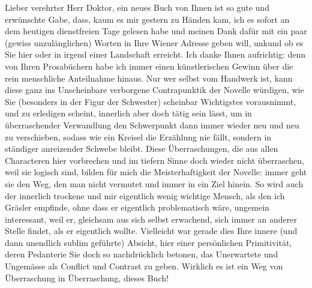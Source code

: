 \pstart{}Lieber verehrter Herr Doktor,\pend\vspace{0.5em}
\pstart
           ein neues Buch von Ihnen ist
               so gute und erwünschte Gabe, dass, kaum es mir gestern zu Händen kam, ich es sofort
               an dem heutigen dienstfreien Tage gelesen habe und meinen Dank dafür mit ein paar
               (gewiss unzulänglichen) Worten in Ihre Wiener Adresse geben will, unkund ob es Sie hier oder in
               irgend einer Landschaft erreicht. Ich danke Ihnen aufrichtig: denn von Ihren
               Prosabüchern habe ich immer einen künstlerischen Gewinn über die rein menschliche
               Anteilnahme hinaus. Nur wer selbst vom Handwerk ist, kann diese ganz ins Unscheinbare
               verborgene Contrapunktik der Novelle würdigen, wie Sie (besonders in der Figur der Schwester) scheinbar Wichtigstes
               vorausnimmt, {\pb}und zu erledigen scheint,
               innerlich aber doch tätig sein lässt, um in überraschender Verwandlung den
               Schwerpunkt dann immer wieder neu und neu zu verschieben, sodass wie ein Kreisel die
                  Erzählung nie fällt,
               sondern in ständiger anreizender Schwebe bleibt. Diese Überraschungen, die aus allen
               Characteren hier vorbrechen und im tiefern Sinne doch wieder nicht überraschen, weil
               sie logisch sind, bilden für mich die Meisterhaftigkeit der Novelle: immer geht sie den Weg, den man
               nicht vermutet und immer in ein Ziel hinein. So wird auch der innerlich trockene und
               mir eigentlich wenig wichtige Mensch, als den ich Gräsler empfinde, ohne dass er eigentlich problematisch
               wäre, ungemein interessant, weil er, gleichsam aus sich selbst erwachend, sich immer
               an anderer Stelle findet, als er eigentlich wollte. Vielleicht war gerade dies Ihre
               innere (und dann unendlich sublim geführte) Absicht, hier einer persönlichen
               Primitivität, deren {\pb}Pedanterie Sie doch
               so nachdrücklich betonen, das Unerwartete und Ungemässe als Conflict und Contrast zu
               geben. Wirklich es ist ein Weg von Überraschung in Überraschung, dieses Buch!\pend
           

